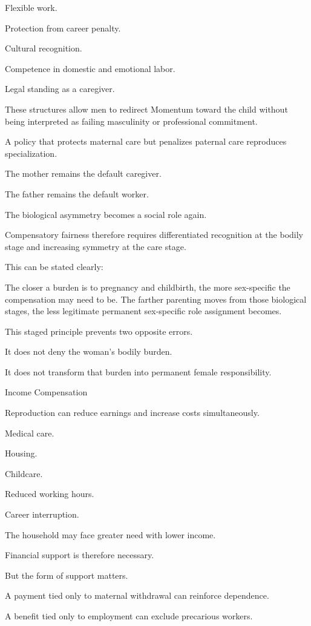 Flexible work.

Protection from career penalty.

Cultural recognition.

Competence in domestic and emotional labor.

Legal standing as a caregiver.

These structures allow men to redirect Momentum toward the child without being interpreted as failing masculinity or professional commitment.

A policy that protects maternal care but penalizes paternal care reproduces specialization.

The mother remains the default caregiver.

The father remains the default worker.

The biological asymmetry becomes a social role again.

Compensatory fairness therefore requires differentiated recognition at the bodily stage and increasing symmetry at the care stage.

This can be stated clearly:

The closer a burden is to pregnancy and childbirth, the more sex-specific the compensation may need to be. The farther parenting moves from those biological stages, the less legitimate permanent sex-specific role assignment becomes.

This staged principle prevents two opposite errors.

It does not deny the woman’s bodily burden.

It does not transform that burden into permanent female responsibility.

Income Compensation

Reproduction can reduce earnings and increase costs simultaneously.

Medical care.

Housing.

Childcare.

Reduced working hours.

Career interruption.

The household may face greater need with lower income.

Financial support is therefore necessary.

But the form of support matters.

A payment tied only to maternal withdrawal can reinforce dependence.

A benefit tied only to employment can exclude precarious workers.

